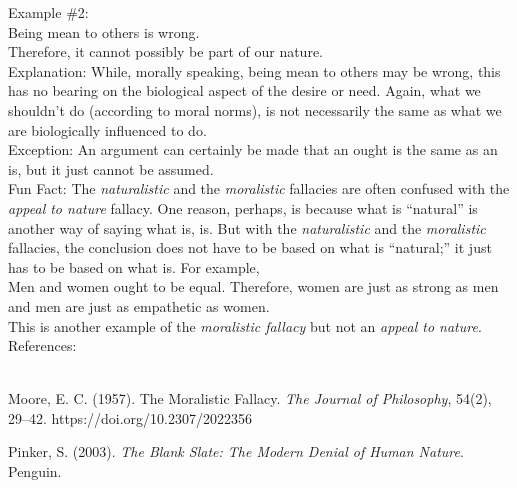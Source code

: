 \documentclass[a4paper,12pt,single,pdftex]{scrartcl}
\begin{document}
{      
        Example \#2:
      \\

      
        Being mean to others is wrong.
      \\

      
        Therefore, it cannot possibly be part of our nature.
      \\

      
        Explanation: While, morally speaking, being mean to others may be wrong, this has no bearing on the biological aspect of the desire or need. Again, what we shouldn’t do (according to moral norms), is not necessarily the same as what we are biologically influenced to do.
      \\

      
        Exception: An argument can certainly be made that an ought is the same as an is, but it just cannot be assumed.
      \\

      
        Fun Fact: The {\it naturalistic} and the {\it moralistic}  fallacies are often confused with the {\it appeal to nature}  fallacy. One reason, perhaps, is because what is “natural” is another way of saying what is, is. But with the {\it naturalistic} and the {\it moralistic}  fallacies, the conclusion does not have to be based on what is “natural;” it just has to be based on what is. For example,
      \\

      
        Men and women ought to be equal. Therefore, women are just as strong as men and men are just as empathetic as women.
      \\

      
        This is another example of the {\it moralistic fallacy} but not an {\it appeal to nature}.
      \\

    
    References:

    
      
        
      \\

      
        
          Moore, E. C. (1957). The Moralistic Fallacy. {\it The Journal of Philosophy}, 54(2), 29–42. https://doi.org/10.2307/2022356
        
        
          Pinker, S. (2003). {\it The Blank Slate: The Modern Denial of Human Nature}. Penguin.
        
      
    
  }
\end{document}
